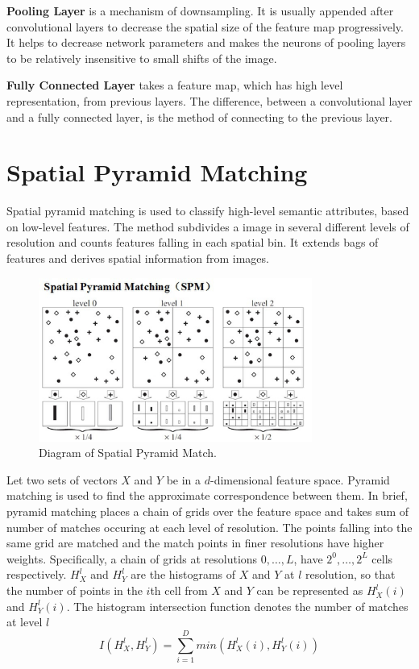 \textbf{Pooling Layer} is a mechanism of downsampling. It is usually appended after convolutional layers to decrease the spatial size of the feature map progressively. It helps to decrease network parameters and makes the neurons of pooling layers to be relatively insensitive to small shifts of the image.

\textbf{Fully Connected Layer} takes a feature map, which has high level representation, from previous layers. The difference, between a convolutional layer and a fully connected layer, is the method of connecting to the previous layer.

\section{Spatial Pyramid Matching}

Spatial pyramid matching\citep{lazebnik2006beyond} is used to classify high-level semantic attributes, based on low-level features. The method subdivides a image in several different levels of resolution and counts features falling in each spatial bin. It extends bags of features and derives spatial information from images.
\graphicspath{ {./Figures/} }
\begin{figure}[!htb]
\centering
\includegraphics[width=0.8\textwidth]{spm.jpg}
\caption{\label{fig:perceptron}Diagram of Spatial Pyramid Match.}
\end{figure}

Let two sets of vectors $X$ and $Y$ be in a $d$-dimensional feature space. Pyramid matching is used to find the approximate correspondence between them. In brief, pyramid matching places a chain of grids over the feature space and takes sum of number of matches occuring at each level of resolution. The points falling into the same grid are matched and the match points in finer resolutions have higher weights. Specifically, a chain of grids at resolutions $0,\dotso,L$, have $2^0,\dotso,2^L$ cells respectively. $H_{X}^l$ and $H_{Y}^l$ are the histograms of $X$ and $Y$ at $l$ resolution, so that the number of points in the $i$th cell from $X$ and $Y$ can be represented as $H_{X}^l(i)$ and $H_{Y}^l(i)$. The histogram intersection function denotes the number of matches at level $l$
\begin{equation}\label{eq:HistInterFunc}
I(H_{X}^l, H_{Y}^l) = \sum_{i=1}^D min(H_{X}^l(i), H_{Y}^l(i))
\end{equation}

